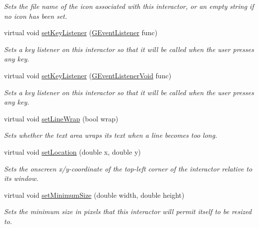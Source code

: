 \begin{DoxyCompactItemize}
\begin{DoxyCompactList}\small\item\em Sets the file name of the icon associated with this interactor, or an empty string if no icon has been set. \end{DoxyCompactList}\item 
virtual void \mbox{\hyperlink{classsgl_1_1GInteractor_aeb8324d3287fa1fbe093f4d6230cf0a6}{set\+Key\+Listener}} (\mbox{\hyperlink{namespacesgl_ae9f3e9eab70035da1a2b114e21357b25}{G\+Event\+Listener}} func)
\begin{DoxyCompactList}\small\item\em Sets a key listener on this interactor so that it will be called when the user presses any key. \end{DoxyCompactList}\item 
virtual void \mbox{\hyperlink{classsgl_1_1GInteractor_ae48ecea73606c7bd9423e1c7cc589cc9}{set\+Key\+Listener}} (\mbox{\hyperlink{namespacesgl_a54427ce97bb1c2804e4fe2b0a62e8b17}{G\+Event\+Listener\+Void}} func)
\begin{DoxyCompactList}\small\item\em Sets a key listener on this interactor so that it will be called when the user presses any key. \end{DoxyCompactList}\item 
virtual void \mbox{\hyperlink{classsgl_1_1GTextArea_aaaafb06fec060b28b70ec3b7379657b4}{set\+Line\+Wrap}} (bool wrap)
\begin{DoxyCompactList}\small\item\em Sets whether the text area wraps its text when a line becomes too long. \end{DoxyCompactList}\item 
virtual void \mbox{\hyperlink{classsgl_1_1GInteractor_a04594e8ba9b98513a64f1da00dcae18c}{set\+Location}} (double x, double y)
\begin{DoxyCompactList}\small\item\em Sets the onscreen x/y-\/coordinate of the top-\/left corner of the interactor relative to its window. \end{DoxyCompactList}\item 
virtual void \mbox{\hyperlink{classsgl_1_1GInteractor_a0cf428e207b7f22cc08138a90b1b87b2}{set\+Minimum\+Size}} (double width, double height)
\begin{DoxyCompactList}\small\item\em Sets the minimum size in pixels that this interactor will permit itself to be resized to. \end{DoxyCompactList}\item 

\end{DoxyCompactItemize}
